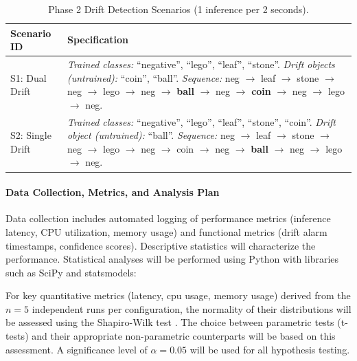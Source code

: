 \begin{table}[htbp]
  \caption[Drift Detection Scenarios]{Phase 2 Drift Detection Scenarios (1 inference per 2 seconds).}
  \label{tab:drift_scenarios_refined}
  \begin{tabularx}{\linewidth}{@{}lX@{}}
    \toprule 
    \textbf{Scenario ID} & \textbf{Specification} \\ 
    \midrule 
    S1: Dual Drift & 
      \textit{Trained classes:} ``negative'', ``lego'', ``leaf'', ``stone''. \newline
      \textit{Drift objects (untrained):} ``coin'', ``ball''. \newline
      \textit{Sequence:} neg $\rightarrow$ leaf $\rightarrow$ stone $\rightarrow$ neg $\rightarrow$ lego $\rightarrow$ neg $\rightarrow$ \textbf{ball} $\rightarrow$ neg $\rightarrow$ \textbf{coin} $\rightarrow$ neg $\rightarrow$ lego $\rightarrow$ neg. \\[0.5em]

    S2: Single Drift & 
      \textit{Trained classes:} ``negative'', ``lego'', ``leaf'', ``stone'', ``coin''. \newline
      \textit{Drift object (untrained):} ``ball''. \newline
      \textit{Sequence:} neg $\rightarrow$ leaf $\rightarrow$ stone $\rightarrow$ neg $\rightarrow$ lego $\rightarrow$ neg $\rightarrow$ coin $\rightarrow$ neg $\rightarrow$ \textbf{ball} $\rightarrow$ neg $\rightarrow$ lego $\rightarrow$ neg. \\
    \bottomrule
  \end{tabularx}
\end{table}

\paragraph{Data Collection, Metrics, and Analysis Plan}
Data collection includes automated logging of performance metrics (inference latency, CPU utilization, memory usage) and functional metrics (drift alarm timestamps, confidence scores). Descriptive statistics will characterize the performance. Statistical analyses will be performed using Python with libraries such as SciPy and statsmodels: 

For key quantitative metrics (latency, \gls{cpu} usage, memory usage) derived from the $n=5$ independent runs per configuration, the normality of their distributions will be assessed using the Shapiro-Wilk test \cite{shapiroAnalysisVarianceTest}. The choice between parametric tests (t-tests) and their appropriate non-parametric counterparts will be based on this assessment. A significance level of $\alpha = 0.05$ will be used for all hypothesis testing.

